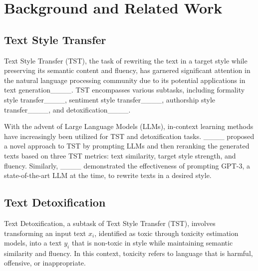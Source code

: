 \section{Background and Related Work}
\subsection{Text Style Transfer}

Text Style Transfer (TST), the task of rewriting the text in a target style while preserving its semantic content and fluency, has garnered significant attention in the natural language processing community due to its potential applications in text generation____. TST encompasses various subtasks, including formality style transfer____, sentiment style transfer____, authorship style transfer____, and detoxification____. 

With the advent of Large Language Models (LLMs), in-context learning methods have increasingly been utilized for TST and detoxification tasks. ____ proposed a novel approach to TST by prompting LLMs and then reranking the generated texts based on three TST metrics: text similarity, target style strength, and fluency. Similarly, ____ demonstrated the effectiveness of prompting GPT-3, a state-of-the-art LLM at the time, to rewrite texts in a desired style.

\subsection{Text Detoxification}

Text Detoxification, a subtask of Text Style Transfer (TST), involves transforming an input text $x_i$, identified as toxic through toxicity estimation models, into a text $y_i$ that is non-toxic in style while maintaining semantic similarity and fluency. In this context, toxicity refers to language that is harmful, offensive, or inappropriate.


